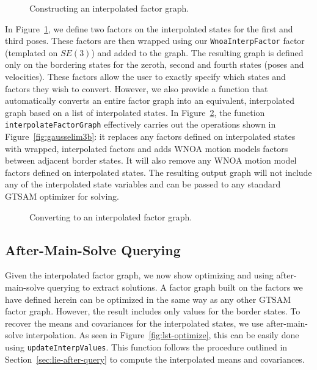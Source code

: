 \begin{figure}[ht!]
	\centering
	\caption{Constructing an interpolated factor graph.}
	\label{fig:lst-interp}
\end{figure}

In Figure~\ref{fig:lst-interp}, we define two factors on the interpolated states for the first and third poses. These factors are then wrapped using our \texttt{WnoaInterpFactor} factor (templated on $SE(3)$) and added to the graph.
The resulting graph is defined only on the bordering states for the zeroth, second and fourth states (poses and velocities).
These factors allow the user to exactly specify which states and factors they wish to convert.
However, we also provide a function that automatically converts an entire factor graph into an equivalent, interpolated graph based on a list of interpolated states. In Figure~\ref{fig:lst-convert}, the function \texttt{interpolateFactorGraph} effectively carries out the operations shown in Figure~\ref{fig:gausselim3b}: it replaces any factors defined on interpolated states with wrapped, interpolated factors and adds \ac{WNOA} motion models factors between adjacent border states. It will also remove any \ac{WNOA} motion model factors defined on interpolated states. The resulting output graph will not include any of the interpolated state variables and can be passed to any standard \ac{GTSAM} optimizer for solving.

\begin{figure}[ht!]
	\centering
	\caption{Converting to an interpolated factor graph.}
	\label{fig:lst-convert}
\end{figure}


\subsection{After-Main-Solve Querying}\label{sec:post-query-implem}
Given the interpolated factor graph, we now show optimizing and using after-main-solve querying to extract solutions.
A factor graph built on the factors we have defined herein can be optimized in the same way as any other \ac{GTSAM} factor graph.
However, the result includes only values for the border states.
To recover the means and covariances for the interpolated states, we use after-main-solve interpolation.
As seen in Figure~\ref{fig:lst-optimize}, this can be easily done using \texttt{updateInterpValues}.
This function follows the procedure outlined in Section~\ref{sec:lie-after-query} to compute the interpolated means and covariances.

